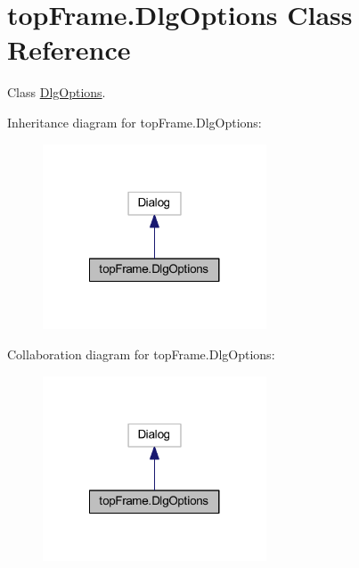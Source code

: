 \hypertarget{classtop_frame_1_1_dlg_options}{\section{top\-Frame.\-Dlg\-Options Class Reference}
\label{classtop_frame_1_1_dlg_options}
}


Class \hyperlink{classtop_frame_1_1_dlg_options}{Dlg\-Options}.  




Inheritance diagram for top\-Frame.\-Dlg\-Options\-:\nopagebreak
\begin{figure}[H]
\begin{center}
\leavevmode
\includegraphics[width=188pt]{classtop_frame_1_1_dlg_options__inherit__graph}
\end{center}
\end{figure}


Collaboration diagram for top\-Frame.\-Dlg\-Options\-:\nopagebreak
\begin{figure}[H]
\begin{center}
\leavevmode
\includegraphics[width=188pt]{classtop_frame_1_1_dlg_options__coll__graph}
\end{center}
\end{figure}
